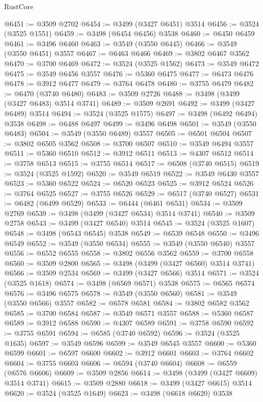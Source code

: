 \begin{lexlean}{RustCore}
\begin{coremodule}
@6451 := @3509 @2702
@6454 := @3499 (@3427 @6451) @3514
@6456 := @3524 (@3525 @1551)
@6459 := @3498 (@6454 @6456) @3538
@6460 := @6450 @6459
@6461 := @3496 @6460
@6463 := @3549 (@3550 @6445)
@6466 := @3549 (@3550 @6451) @3557
@6467 := @6463 @6466
@6469 := @3802 @6467 @3562
@6470 := @3700 @6469
@6472 := @3524 (@3525 @1562)
@6473 := @3549 @6472
@6475 := @3549 @6456 @3557
@6476 := @5360 @6475
@6477 := @6473 @6476
@6478 := @3912 @6477
@6479 := @3764 @6478
@6480 := @3755 @6479
@6482 := @6470 (@3740 @6480)
@6483 := @3509 @2726
@6488 := @3498 (@3499 (@3427 @6483) @3514 @3741)
@6489 := @3509 @2691
@6492 := @3499 (@3427 @6489) @3514
@6494 := @3524 (@3525 @1575)
@6497 := @3498 (@6492 @6494) @3538
@6498 := @6488 @6497
@6499 := @3496 @6498
@6501 := @3549 (@3550 @6483)
@6504 := @3549 (@3550 @6489) @3557
@6505 := @6501 @6504
@6507 := @3802 @6505 @3562
@6508 := @3700 @6507
@6510 := @3549 @6494 @3557
@6511 := @5360 @6510
@6512 := @3912 @6511
@6513 := @4307 @6512
@6514 := @3758 @6513
@6515 := @3755 @6514
@6517 := @6508 (@3740 @6515)
@6519 := @3524 (@3525 @1592)
@6520 := @3549 @6519
@6522 := @3549 @6430 @3557
@6523 := @5360 @6522
@6524 := @6520 @6523
@6525 := @3912 @6524
@6526 := @3764 @6525
@6527 := @3755 @6526
@6529 := @6517 (@3740 @6527)
@6531 := @6482 (@6499 @6529)
@6533 := @6444 (@6461 @6531)
@6534 := @3509 @2769
@6539 := @3498 (@3499 (@3427 @6534) @3514 @3741)
@6540 := @3509 @2758
@6543 := @3499 (@3427 @6540) @3514
@6545 := @3524 (@3525 @1607)
@6548 := @3498 (@6543 @6545) @3538
@6549 := @6539 @6548
@6550 := @3496 @6549
@6552 := @3549 (@3550 @6534)
@6555 := @3549 (@3550 @6540) @3557
@6556 := @6552 @6555
@6558 := @3802 @6556 @3562
@6559 := @3700 @6558
@6560 := @3509 @2800
@6565 := @3498 (@3499 (@3427 @6560) @3514 @3741)
@6566 := @3509 @2534
@6569 := @3499 (@3427 @6566) @3514
@6571 := @3524 (@3525 @1618)
@6574 := @3498 (@6569 @6571) @3538
@6575 := @6565 @6574
@6576 := @3496 @6575
@6578 := @3549 (@3550 @6560)
@6581 := @3549 (@3550 @6566) @3557
@6582 := @6578 @6581
@6584 := @3802 @6582 @3562
@6585 := @3700 @6584
@6587 := @3549 @6571 @3557
@6588 := @5360 @6587
@6589 := @3912 @6588
@6590 := @4307 @6589
@6591 := @3758 @6590
@6592 := @3755 @6591
@6594 := @6585 (@3740 @6592)
@6596 := @3524 (@3525 @1635)
@6597 := @3549 @6596
@6599 := @3549 @6545 @3557
@6600 := @5360 @6599
@6601 := @6597 @6600
@6602 := @3912 @6601
@6603 := @3764 @6602
@6604 := @3755 @6603
@6606 := @6594 (@3740 @6604)
@6608 := @6559 (@6576 @6606)
@6609 := @3509 @2856
@6614 := @3498 (@3499 (@3427 @6609) @3514 @3741)
@6615 := @3509 @2880
@6618 := @3499 (@3427 @6615) @3514
@6620 := @3524 (@3525 @1649)
@6623 := @3498 (@6618 @6620) @3538

\end{coremodule}
\end{lexlean}
